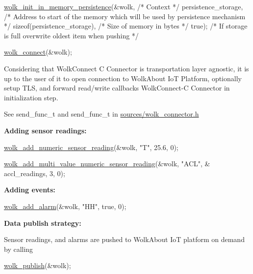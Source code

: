 \begin{DoxyCode}
\hyperlink{wolk__connector_8h_a0fbb983c6b65072501b078ba6ff8e5ad}{wolk\_init\_in\_memory\_persistence}(&wolk,                       \textcolor{comment}{/* Context */}
                                persistence\_storage,         \textcolor{comment}{/* Address to start of the memory which will
       be used by persistence mechanism */}
                                \textcolor{keyword}{sizeof}(persistence\_storage), \textcolor{comment}{/* Size of memory in bytes */}
                                \textcolor{keyword}{true});                       \textcolor{comment}{/* If storage is full overwrite oldest item
       when pushing */}

\hyperlink{wolk__connector_8h_ab246fad03ad57f3efe89f4ec2c93a288}{wolk\_connect}(&wolk);
\end{DoxyCode}
 Considering that Wolk\+Connect C Connector is transportation layer agnostic, it is up to the user of it to open connection to Wolk\+About IoT Platform, optionally setup T\+LS, and forward read/write callbacks Wolk\+Connect-\/C Connector in initialization step.

See {\ttfamily send\+\_\+func\+\_\+t} and {\ttfamily send\+\_\+func\+\_\+t} in {\ttfamily \hyperlink{wolk__connector_8h}{sources/wolk\+\_\+connector.\+h}}

{\bfseries Adding sensor readings\+:} 
\begin{DoxyCode}
\hyperlink{wolk__connector_8h_ab7bcc53c7c06a6cc2b8db5190b1af70f}{wolk\_add\_numeric\_sensor\_reading}(&wolk, \textcolor{stringliteral}{"T"}, 25.6, 0);

\hyperlink{wolk__connector_8h_a27582cf8777d4a8c5f4e8a7aae4c71e0}{wolk\_add\_multi\_value\_numeric\_sensor\_reading}(&wolk, \textcolor{stringliteral}{"ACL"}, &
      accl\_readings, 3, 0);
\end{DoxyCode}


{\bfseries Adding events\+:} 
\begin{DoxyCode}
\hyperlink{wolk__connector_8h_aec965973c23d360dc158d8ef6d037e54}{wolk\_add\_alarm}(&wolk, \textcolor{stringliteral}{"HH"}, \textcolor{keyword}{true}, 0);
\end{DoxyCode}


{\bfseries Data publish strategy\+:}

Sensor readings, and alarms are pushed to Wolk\+About IoT platform on demand by calling 
\begin{DoxyCode}
\hyperlink{wolk__connector_8h_ac5e7ddb346ea4b9a7cc4511d3728be09}{wolk\_publish}(&wolk);
\end{DoxyCode}


